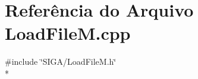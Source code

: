 \section{Referência do Arquivo Load\+File\+M.\+cpp}
\label{_load_file_m_8cpp}
{\ttfamily \#include \char`\"{}S\+I\+G\+A/\+Load\+File\+M.\+h\char`\"{}}\\*
